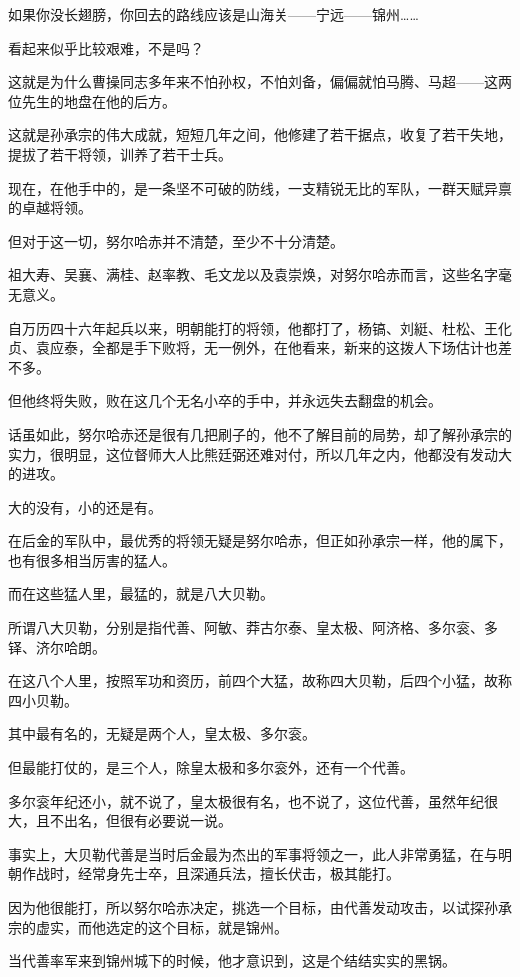 \begin{multicols}{\theparacolNo}
		如果你没长翅膀，你回去的路线应该是山海关——宁远——锦州……

		看起来似乎比较艰难，不是吗？

		这就是为什么曹操同志多年来不怕孙权，不怕刘备，偏偏就怕马腾、马超——这两位先生的地盘在他的后方。

		这就是孙承宗的伟大成就，短短几年之间，他修建了若干据点，收复了若干失地，提拔了若干将领，训养了若干士兵。

		现在，在他手中的，是一条坚不可破的防线，一支精锐无比的军队，一群天赋异禀的卓越将领。

		但对于这一切，努尔哈赤并不清楚，至少不十分清楚。

		祖大寿、吴襄、满桂、赵率教、毛文龙以及袁崇焕，对努尔哈赤而言，这些名字毫无意义。

		自万历四十六年起兵以来，明朝能打的将领，他都打了，杨镐、刘綎、杜松、王化贞、袁应泰，全都是手下败将，无一例外，在他看来，新来的这拨人下场估计也差不多。

		但他终将失败，败在这几个无名小卒的手中，并永远失去翻盘的机会。

		话虽如此，努尔哈赤还是很有几把刷子的，他不了解目前的局势，却了解孙承宗的实力，很明显，这位督师大人比熊廷弼还难对付，所以几年之内，他都没有发动大的进攻。

		大的没有，小的还是有。

		在后金的军队中，最优秀的将领无疑是努尔哈赤，但正如孙承宗一样，他的属下，也有很多相当厉害的猛人。

		而在这些猛人里，最猛的，就是八大贝勒。

		所谓八大贝勒，分别是指代善、阿敏、莽古尔泰、皇太极、阿济格、多尔衮、多铎、济尔哈朗。

		在这八个人里，按照军功和资历，前四个大猛，故称四大贝勒，后四个小猛，故称四小贝勒。

		其中最有名的，无疑是两个人，皇太极、多尔衮。

		但最能打仗的，是三个人，除皇太极和多尔衮外，还有一个代善。

		多尔衮年纪还小，就不说了，皇太极很有名，也不说了，这位代善，虽然年纪很大，且不出名，但很有必要说一说。

		事实上，大贝勒代善是当时后金最为杰出的军事将领之一，此人非常勇猛，在与明朝作战时，经常身先士卒，且深通兵法，擅长伏击，极其能打。

		因为他很能打，所以努尔哈赤决定，挑选一个目标，由代善发动攻击，以试探孙承宗的虚实，而他选定的这个目标，就是锦州。

		当代善率军来到锦州城下的时候，他才意识到，这是个结结实实的黑锅。


\end{multicols}
